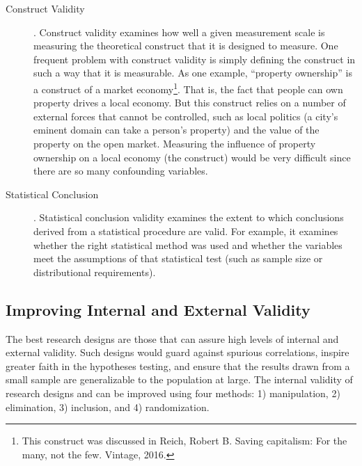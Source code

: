 \begin{description}
	\item[Construct Validity]. Construct validity examines how well a given measurement scale is measuring the theoretical construct that it is designed to measure. One frequent problem with construct validity is simply defining the construct in such a way that it is measurable. As one example, ``property ownership'' is a construct of a market economy\footnote{This construct was discussed in Reich, Robert B. Saving capitalism: For the many, not the few. Vintage, 2016.}. That is, the fact that people can own property drives a local economy. But this construct relies on a number of external forces that cannot be controlled, such as local politics (a city's eminent domain can take a person's property) and the value of the property on the open market. Measuring the influence of property ownership on a local economy (the construct) would be very difficult since there are so many confounding variables. 
	
	\item[Statistical Conclusion]. Statistical conclusion validity examines the extent to which conclusions derived from a statistical procedure are valid. For example, it examines whether the right statistical method was used and whether the variables meet the assumptions of that statistical test (such as sample size or distributional requirements). 
	
\end{description}


\subsection{Improving Internal and External Validity}

The best research designs are those that can assure high levels of internal and external validity. Such designs would guard against spurious correlations, inspire greater faith in the hypotheses testing, and ensure that the results drawn from a small sample are generalizable to the population at large. The internal validity of research designs and can be improved using four methods: 1) manipulation, 2) elimination, 3) inclusion, and 4) randomization.


